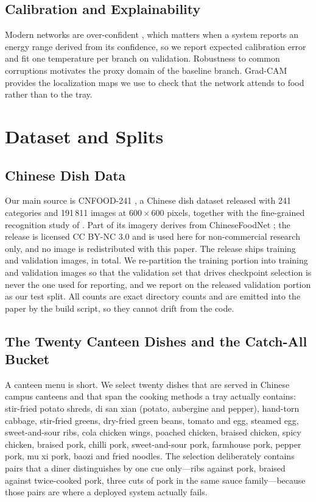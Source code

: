 \documentclass[conference]{IEEEtran}
\begin{document}
\subsection{Calibration and Explainability}
Modern networks are over-confident \cite{guo2017calibration}, which matters when
a system reports an energy range derived from its confidence, so we report
expected calibration error and fit one temperature per branch on validation.
Robustness to common corruptions \cite{hendrycks2019robustness} motivates the
proxy domain of the baseline branch. Grad-CAM \cite{selvaraju2017gradcam}
provides the localization maps we use to check that the network attends to food
rather than to the tray.

\section{Dataset and Splits}
\label{sec:data}
\subsection{Chinese Dish Data}
Our main source is CNFOOD-241 \cite{cnfood241}, a Chinese dish dataset released
with 241 categories and 191\,811 images at $600\times600$ pixels, together with
the fine-grained recognition study of \cite{xiong2026cnfood}. Part of its imagery
derives from ChineseFoodNet \cite{chen2017chinesefoodnet}; the release is
licensed CC BY-NC 3.0 and is used here for non-commercial research only, and no
image is redistributed with this paper. The release ships \cnPrePoolN{} training and
\cnPreTestN{} validation images, \cnAllN{} in total. We re-partition the training
portion into
\cnPreTrainN{} training and \cnPreValN{} validation images so that the validation
set that drives checkpoint selection is never the one used for reporting, and we
report on the released validation portion as our test split. All counts are exact directory counts and are emitted
into the paper by the build script, so they cannot drift from the code.

\subsection{The Twenty Canteen Dishes and the Catch-All Bucket}
A canteen menu is short. We select twenty dishes that are served in Chinese
campus canteens and that span the cooking methods a tray actually contains:
stir-fried potato shreds, di san xian (potato, aubergine and pepper), hand-torn
cabbage, stir-fried greens, dry-fried green beans, tomato and egg, steamed egg,
sweet-and-sour ribs, cola chicken wings, poached chicken, braised chicken, spicy
chicken, braised pork, chilli pork, sweet-and-sour pork, farmhouse pork, pepper
pork, mu xi pork, baozi and fried noodles. The selection deliberately contains
pairs that a diner distinguishes by one cue only---ribs against pork, braised
against twice-cooked pork, three cuts of pork in the same sauce family---because
those pairs are where a deployed system actually fails.
\end{document}
